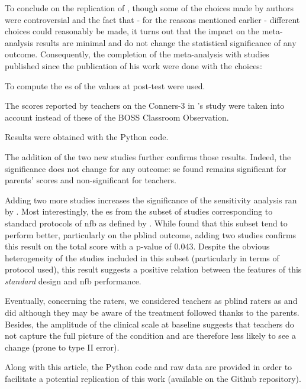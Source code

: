 To conclude on the replication of \citet{Cortese2016}, though some of the choices made by authors
were controversial and the fact that - for the reasons mentioned earlier - different choices could reasonably be made, 
it turns out that the impact on the meta-analysis results are minimal and do not change the statistical significance of any outcome. 
Consequently, the completion of the meta-analysis with studies published since the publication of his work were done with the choices: 
\begin{description} 
	\item To compute the \gls{es} of \citet{Arnold2014} the values at post-test were used.
	\item The scores reported by teachers on the Conners-3 in \citeauthor{Steiner2014}'s study were taken into account instead of these of 
	the BOSS Classroom Observation.
	\item Results were obtained with the Python code.
\end{description} 

The addition of the two new studies \citep{Strehl2017, Baumeister2016} further confirms those results. Indeed, 
the significance does not change for any outcome: \gls{se} found remains significant for parents' scores and 
non-significant for teachers. 

Adding two more studies increases the significance of the sensitivity analysis ran by \citeauthor{Cortese2016}. 
Most interestingly, the \gls{es} from the subset of studies corresponding to standard protocols of \gls{nfb} as 
defined by \citet{Arns2014}. While \citeauthor{Cortese2016} found that this subset tend to perform better, particularly
 on the \gls{pblind} outcome, adding two studies confirms this result on the total score with a p-value of 0.043. 
Despite the obvious heterogeneity of the studies included in this subset (particularly in terms of protocol used), 
this result suggests a positive relation between the features of this \emph{standard} design and \gls{nfb} performance.

Eventually, concerning the raters, we considered teachers as \gls{pblind} raters as \citeauthor{Cortese2016} and 
\citeauthor{Micoulaud2014} did although they may be aware of the treatment followed thanks to the parents. 
Besides, the amplitude of the clinical scale at baseline suggests that teachers do not capture the full picture of 
the condition and are therefore less likely to see a change (prone to type II error).

Along with this article, the Python code and raw data are provided in order to facilitate a potential replication of this work
(available on the Github repository).  

